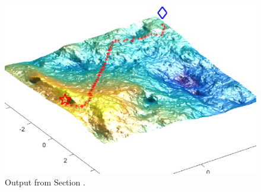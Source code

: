 \documentclass[Space3_Assign3.tex]{subfile}
\begin{document}
\begin{figure}[h]
\centering
\caption{Output from Section . }
\label{Fig:DijkstraTerrain}
\includegraphics[width = 0.7\linewidth]{Dijstra_terrain.eps}
\end{figure}
\end{document}
